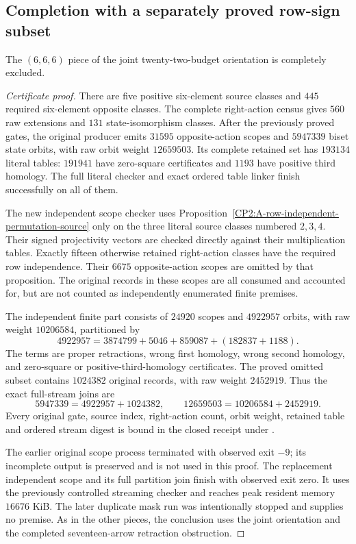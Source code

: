 \subsection{Completion with a separately proved row-sign subset}

\begin{proposition}
\label{CP2:A-oriented-eighteen-six-six-six}
The $(6,6,6)$ piece of the joint twenty-two-budget orientation is
completely excluded.
\end{proposition}
\begin{proof}[Certificate proof]
There are five positive six-element source classes and $445$ required
six-element opposite classes.  The complete right-action census gives
$560$ raw extensions and $131$ state-isomorphism classes.  After the
previously proved gates, the original producer emits $31595$ opposite-action
scopes and $5947339$ biset state orbits, with raw orbit weight $12659503$.
Its complete retained set has $193134$ literal tables: $191941$ have
zero-square certificates and $1193$ have positive third homology.  The
full literal checker and exact ordered table linker finish successfully
on all of them.

The new independent scope checker uses
Proposition~\ref{CP2:A-row-independent-permutation-source} only on the
three literal source classes numbered $2,3,4$.  Their signed projectivity
vectors are checked directly against their multiplication tables.
Exactly fifteen otherwise retained right-action classes have the required
row independence.  Their $6675$ opposite-action scopes are omitted by
that proposition.  The original records in these scopes are all consumed
and accounted for, but are not counted as independently enumerated
finite premises.

The independent finite part consists of $24920$ scopes and $4922957$
orbits, with raw weight $10206584$, partitioned by
\[
 4922957=3874799+5046+859087+(182837+1188).
\]
The terms are proper retractions, wrong first homology, wrong second
homology, and zero-square or positive-third-homology certificates.
The proved omitted subset contains $1024382$ original records, with raw
weight $2452919$.  Thus the exact full-stream joins are
\[
 5947339=4922957+1024382,\qquad
 12659503=10206584+2452919.
\]
Every original gate, source index, right-action count, orbit weight,
retained table and ordered stream digest is bound in the closed receipt
 under
.

The earlier original scope process terminated with observed exit $-9$;
its incomplete output is preserved and is not used in this proof.
The replacement independent scope and its full partition join finish
with observed exit zero.  It uses the previously controlled streaming
checker and reaches peak resident memory $16676$ KiB.  The later
duplicate mask run was intentionally stopped and supplies no premise.
As in the other pieces, the conclusion uses the joint orientation and
the completed seventeen-arrow retraction obstruction.
\end{proof}
